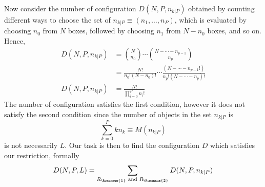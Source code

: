 \documentclass[../../main.tex]{subfiles}
\begin{document}
Now consider the number of configuration $D(N,P,n_{k|P})$ obtained by counting different ways to choose the set of $n_{k|P}\equiv(n_1,\dots,n_P)$, which is evaluated by choosing $n_0$ from $N$ boxes, followed by choosing $n_1$ from $N-n_0$ boxes, and so on. Hence,
\begin{align*}
    D(N,P,n_{k|P})&={N\choose n_0}\cdots{N-\cdots-n_{p-1} \choose n_p}\\
    &=\frac{N!}{n_0!(N-n_0)!}\cdots \frac{(N-\cdots-n_{p-1}!)}{n_p!(N-\cdots-n_p)!}\\
    D(N,P,n_{k|P})&=\frac{N!}{\displaystyle\prod_{i=0}^{P}n_i!}
\end{align*} 
The number of configuration satisfies the first condition, however it does not satisfy the second condition since the number of objects in the set $n_{k|P}$ is 
\begin{equation*}
    \sum_{k=0}^{P }kn_k\equiv M(n_{k|P})
\end{equation*}
is not necessarily $L$. Our task is then to find the configuration $D$ which satisfies our restriction, formally 
\begin{equation*}
    D(N,P,L)=\sum_{R_\Romannum{1}\text{ and }R_\Romannum{2}}D(N,P,n_{k|P})
\end{equation*}
\end{document}
